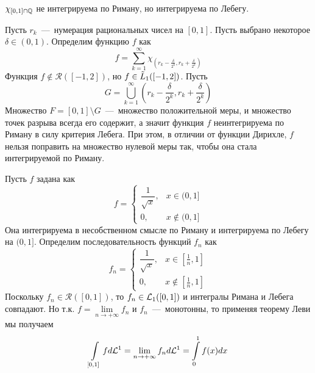 \begin{example}
    $\chi_{[0, 1] \cap \mathbb{Q}}$ не интегрируема по Риману, но интегрируема по Лебегу.
\end{example}
\begin{example}[?]
    Пусть ${r_k}$~---~нумерация рациональных чисел на $[0, 1]$. Пусть выбрано некоторое $\delta \in (0, 1)$. Определим функцию $f$ как \[f = \sum\limits_{k = 1}^\infty \chi_{(r_k - \frac{\delta}{2^k}, r_k + \frac{\delta}{2^k})}\]
    Функция $f \notin \mathcal{R}([-1, 2])$, но $f \in \Tilde{L}_1([-1, 2])$. Пусть \[G = \bigcup\limits_{k = 1}^\infty (r_k - \dfrac{\delta}{2^k}, r_k + \dfrac{\delta}{2^k})\]
     Множество $F = [0, 1] \setminus G$~---~множество положительной меры, и множество точек разрыва всегда его содержит, а значит функция $f$ неинтегрируема по Риману в силу критерия Лебега. При этом, в отличии от функции Дирихле, $f$ нельзя поправить на множество нулевой меры так, чтобы она стала интегрируемой по Риману. 
\end{example}
\begin{example}
    Пусть $f$ задана как \begin{equation*}
    f = 
        \begin{cases}
        \dfrac{1}{\sqrt{x}}, & x \in (0, 1] \\
        0, & x \notin (0, 1]
        \end{cases}
    \end{equation*}
    Она интегрируема в несобственном смысле по Риману и интегрируема по Лебегу на $(0, 1]$. Определим последовательность функций $f_n$ как \begin{equation*}
    f_n = 
        \begin{cases}
         \dfrac{1}{\sqrt{x}}, & x \in [\frac{1}{n}, 1] \\ 
         0, & x \notin [\frac{1}{n}, 1]
        \end{cases}
    \end{equation*}
    Поскольку $f_n \in \mathcal{R}([0, 1])$, то $f_n \in \mathcal{L}_1([0, 1])$ и интегралы Римана и Лебега совпадают. Но т.к. $f = \lim\limits_{n \rightarrow +\infty} f_n$ и $f_n$~---~монотонны, то применяя теорему Леви мы получаем \[\int\limits_{[0, 1]}fd\mathcal{L}^1 = \lim\limits_{n \rightarrow +\infty} f_nd\mathcal{L}^1 = \int\limits_0^1 f(x)dx\]
\end{example}



